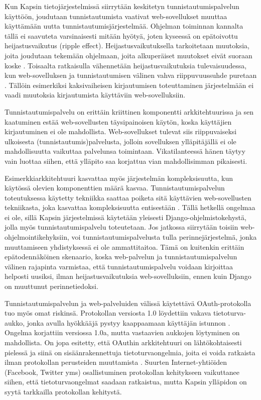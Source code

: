 Kun Kapsin tietojärjestelmissä siirrytään keskitetyn tunnistautumispalvelun käyttöön, joudutaan tunnistautumista vaativat web-sovellukset muuttaa käyttämään uutta tunnistautumisjärjestelmää. Ohjelman toiminnan kannalta tällä ei saavuteta varsinaisesti mitään hyötyä, joten kyseessä on epätoivottu heijastusvaikutus (ripple effect). Heijastusvaikutuksella tarkoitetaan muutoksia, joita joudutaan tekemään ohjelmaan, joita alkuperäiset muutokset eivät suoraan koske \cite{arkkitehtuurit}. Toisaalta ratkaisulla vähennetään heijastusvaikutuksia tulevaisuudessa, kun web-sovelluksen ja tunnistautumisen välinen vahva riippuvuussuhde puretaan \cite{arkkitehtuurit}. Tällöin esimerkiksi kaksivaiheisen kirjautumisen toteuttaminen järjestelmään ei vaadi muutoksia kirjautumista käyttäviin web-sovelluksiin.

Tunnistautumispalvelu on erittäin kriittinen komponentti arkkitehtuurissa ja sen kaatuminen estää web-sovellusten täysipainoisen käytön, koska käyttäjien kirjautuminen ei ole mahdollista. Web-sovellukset tulevat siis riippuvaiseksi ulkoisesta (tunnistautumis)palvelusta, jolloin sovelluksen ylläpitäjällä ei ole mahdollisuutta vaikuttaa palvelunsa toimintaan. Vikatilanteessä hänen täytyy vain luottaa siihen, että ylläpito saa korjattua vian mahdollisimman pikaisesti.

Esimerkkiarkkitehtuuri kasvattaa myös järjestelmän kompleksisuutta, kun käytössä olevien komponenttien määrä kasvaa. Tunnistautumispalvelun toteutuksessa käytetty tekniikka saattaa poiketa sitä käyttävien web-sovellusten tekniikasta, joka kasvattaa kompleksisuutta entisestään \cite{arkkitehtuurit}. Tällä hetkellä ongelmaa ei ole, sillä Kapsin järjestelmissä käytetään yleisesti Django-ohjelmistokehystä, jolla myös tunnistautumispalvelu toteutetaan. Jos jatkossa siirrytään toisiin web-ohjelmointikehyksiin, voi tunnistautumispalvelusta tulla perinnejärjestelmä, jonka muuttamiseen yhdistyksessä ei ole ammattitaitoa. Tämä on kuitenkin erittäin epätodennäköinen skenaario, koska web-palvelun ja tunnistautumispalvelun välinen rajapinta varmistaa, että tunnistautumispalvelu voidaan kirjoittaa helposti uusiksi, ilman heijastusvaikutuksia web-sovelluksiin, ennen kuin Django on muuttunut perinnetiedoksi.

Tunnistautumispalvelun ja web-palveluiden välissä käytettävä OAuth-protokolla tuo myös omat riskinsä. Protokollan versiosta 1.0 löydettiin vakava tietoturva-aukko, jonka avulla hyökkääjä pystyy kaappaamaan käyttäjän istunnon \cite{}. Ongelma korjattiin versiossa 1.0a, mutta vastaavien aukkojen löytyminen on mahdollista. On jopa esitetty, että OAuthin arkkitehtuuri on lähtökohtaisesti pielessä ja siinä on sisäänrakennettuja tietoturvaongelmia, joita ei voida ratkaista ilman protokollan perusteiden muuttamista \cite{}. Suurten Internet-yhtiöiden (Facebook, Twitter yms) osallistuminen protokollan kehitykseen vaikuttanee siihen, että tietoturvaongelmat saadaan ratkaistua, mutta Kapsin ylläpidon on syytä tarkkailla protokollan kehitystä.

